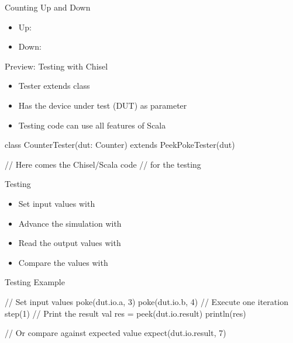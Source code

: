 \begin{frame}[fragile]{Counting Up and Down}
\begin{itemize}
\item Up:
\item Down:
\end{itemize}
\end{frame}


\begin{frame}[fragile]{Preview: Testing with Chisel}
\begin{itemize}
\item Tester extends class 
\item Has the device under test (DUT) as parameter
\item Testing code can use all features of Scala
\end{itemize}
\begin{chisel}
class CounterTester(dut: Counter) extends PeekPokeTester(dut) {

  // Here comes the Chisel/Scala code
  // for the testing
}
\end{chisel}
\end{frame}

\begin{frame}[fragile]{Testing}
\begin{itemize}
\item Set input values with 
\item Advance the simulation with 
\item Read the output values with 
\item Compare the values with 
\end{itemize}
\end{frame}

\begin{frame}[fragile]{Testing Example}
\begin{chisel}
// Set input values
poke(dut.io.a, 3)
poke(dut.io.b, 4)
// Execute one iteration
step(1)
// Print the result
val res = peek(dut.io.result)
println(res)

// Or compare against expected value
expect(dut.io.result, 7)
\end{chisel}
\end{frame}

